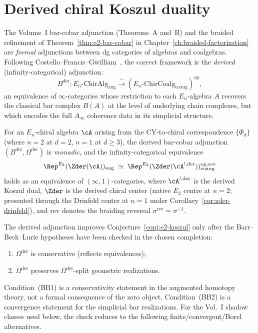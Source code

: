 \section{Derived chiral Koszul duality}
\label{sec:derived-chiral-koszul}

The Volume~I bar-cobar adjunction (Theorems~A and~B) and the braided
refinement of Theorem~\ref{thm:e2-bar-cobar} in
Chapter~\ref{ch:braided-factorization} are \emph{formal} adjunctions
between dg categories of algebras and coalgebras. Following
Costello--Francis--Gwilliam~\cite{CostelloFrancisGwilliam}, the correct
framework is the \emph{derived} (infinity-categorical) adjunction:
\[
 B^{\mathrm{der}} \colon
 E_n\text{-}\mathrm{ChirAlg}_{\mathrm{aug}}
 \xrightarrow{\;\sim\;}
 (E_n\text{-}\mathrm{ChirCoalg}_{\mathrm{coaug}})^{\mathrm{op}},
\]
an equivalence of $\infty$-categories whose restriction to each
$E_n$-algebra $A$ recovers the classical bar complex $B(A)$ at the level
of underlying chain complexes, but which encodes the full $A_\infty$
coherence data in its simplicial structure.

\begin{conjecture}
\label{conj:derived-e2-koszul}
\ClaimStatusConjectured
For an $E_n$-chiral algebra $\cA$ arising from the CY-to-chiral correspondence $\{\Phi_d\}$
(where $n = 2$ at $d = 2$, $n = 1$ at $d \geq 3$), the derived
bar-cobar adjunction
$(B^{\mathrm{der}}, \Omega^{\mathrm{der}})$ is \emph{monadic}, and the
infinity-categorical equivalence
\begin{equation}\label{eq:derived-koszul-equiv}
 \Rep^{E_2}(\Zder(\cA))_{\mathrm{aug}}
 \;\simeq\;
 \Rep^{E_2}(\Zder(\cA^{!,\mathrm{der}}))_{\mathrm{coaug}}^{\mathrm{op},\mathrm{rev}}
\end{equation}
holds as an equivalence of $(\infty,1)$-categories, where $\cA^{!,\mathrm{der}}$
is the derived Koszul dual, $\Zder$ is the derived chiral center
(native $E_2$ centre at $n = 2$; presented through the Drinfeld center
at $n = 1$ under Corollary~\ref{cor:zder-drinfeld}), and $\mathrm{rev}$
denotes the braiding reversal $\sigma^{\mathrm{rev}} = \sigma^{-1}$.
\end{conjecture}

The derived adjunction improves Conjecture~\ref{conj:e2-koszul} only
after the Barr--Beck--Lurie hypotheses have been checked in the
chosen completion:
\begin{enumerate}[label=\textup{(BB\arabic*)}]
 \item $\Omega^{\mathrm{der}}$ is conservative (reflects equivalences);
 \item $\Omega^{\mathrm{der}}$ preserves
 $\Omega^{\mathrm{der}}$-split geometric realizations.
\end{enumerate}
Condition~(BB1) is a conservativity statement in the augmented
homotopy theory, not a formal consequence of the zero object.
Condition~(BB2) is a convergence statement for the simplicial bar
realizations. For the Vol.~I shadow classes used below, the check
reduces to the following finite/convergent/Borel alternatives.

